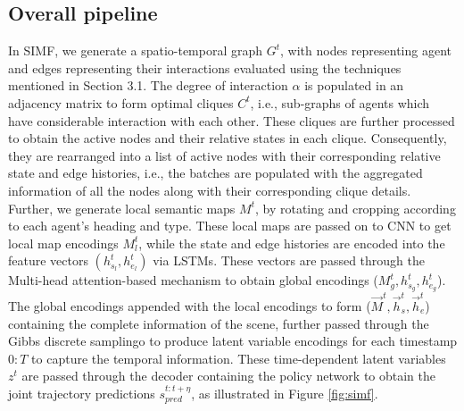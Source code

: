 \documentclass{article}
\begin{document}
\subsection{Overall pipeline}
In SIMF, we generate a spatio-temporal graph $G^t$, with nodes representing agent and edges representing their interactions evaluated using the techniques mentioned in Section 3.1. The degree of interaction $\alpha$ is populated in an adjacency matrix to form optimal cliques $C^t$, i.e., sub-graphs of agents which have considerable interaction with each other. These cliques are further processed to obtain the active nodes and their relative states in each clique. Consequently, they are rearranged into a list of active nodes with their corresponding relative state and edge histories, i.e., the batches are populated with the aggregated information of all the nodes along with their corresponding clique details. Further, we generate local semantic maps \cite{caesar2020nuscenes} $M^t$, by rotating and cropping according to each agent's heading and type. These local maps are passed on to CNN to get local map encodings $M_l^t$,  while the state and edge histories are encoded into the feature vectors $(h_{s_l}^t, h_{e_l}^t)$ via LSTMs. These vectors are passed through the Multi-head attention-based mechanism to obtain global encodings  ($M_g^t, h_{s_g}^t, h_{e_g}^t $). The global encodings appended with the local encodings to form ($\vec M^t, \vec h_{s}^t, \vec h_{e}^t $) containing the complete information of the scene, further passed through the Gibbs discrete samplingo to produce latent variable encodings for each timestamp $0:T$ to capture the temporal information. These time-dependent latent variables $z^t$ are passed through the decoder containing the policy network to obtain the joint trajectory predictions $s_{pred}^{t:t+\eta}$, as illustrated in Figure \ref{fig:simf}. 
\end{document}
